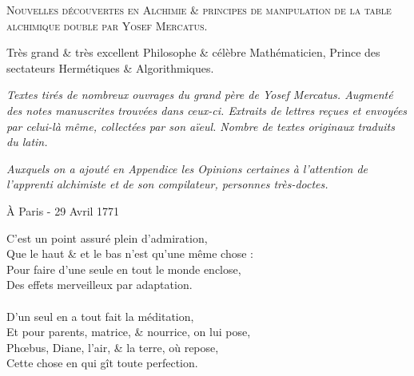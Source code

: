 \newpage

\thispagestyle{empty}

\newlength{\savedparindent}
\setlength{\savedparindent}{\parindent}

\setlength{\parindent}{-4em}


\fontsize{25pt}{25pt}\selectfont{}
\begin{center}
\textsc{Nouvelles découvertes en Alchimie \& principes de manipulation de la
table alchimique double par Yosef Mercatus.}

\vspace*{1cm}

\fontsize{20pt}{20pt}\selectfont{}
Très grand \& très excellent Philosophe \& célèbre Mathématicien, Prince des
sectateurs Hermétiques \& Algorithmiques.

\vspace*{1cm}

\textit{Textes tirés de nombreux ouvrages du grand père de Yosef Mercatus.
Augmenté des notes manuscrites trouvées dans ceux-ci.  Extraits de lettres
reçues et envoyées par celui-là même, collectées par son aïeul.  Nombre de
textes originaux traduits du latin.  }

\textit{Auxquels on a ajouté en Appendice les Opinions certaines à l'attention
de l'apprenti alchimiste et de son compilateur, personnes très-doctes.}
\end{center}
\setlength{\parindent}{\savedparindent}

\fontsize{15pt}{15pt}\selectfont{}
\begin{flushright}
À Paris - 29 Avril 1771
\end{flushright}

\newpage

\normalsize


\noindent{}C'est un point assuré plein d'admiration,\\
Que le haut \& et le bas n'est qu'une même chose :\\
Pour faire d'une seule en tout le monde enclose,\\
Des effets merveilleux par adaptation.\\
\\
D'un seul en a tout fait la méditation,\\
Et pour parents, matrice, \& nourrice, on lui pose,\\
Phœbus, Diane, l'air, \& la terre, où repose,\\
Cette chose en qui gît toute perfection.\\

